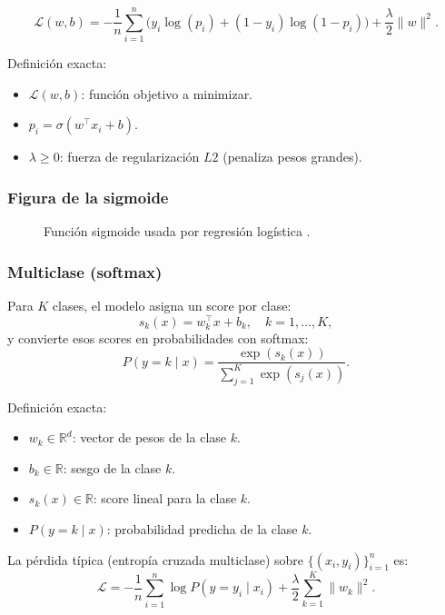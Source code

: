 \documentclass[12pt,oneside]{report}
\newcommand{\R}{\mathbb{R}}
\newcommand{\sigmoid}{\sigma}
\begin{document}
\[
\mathcal{L}(w,b)= -\frac{1}{n}\sum_{i=1}^n \Big(y_i\log(p_i) + (1-y_i)\log(1-p_i)\Big) + \frac{\lambda}{2}\lVert w\rVert^2.
\]

Definición exacta:
\begin{itemize}[leftmargin=*]
  \item $\mathcal{L}(w,b)$: función objetivo a minimizar.
  \item $p_i=\sigmoid(w^\top x_i + b)$.
  \item $\lambda \ge 0$: fuerza de regularización $L2$ (penaliza pesos grandes).
\end{itemize}

\subsubsection{Figura de la sigmoide}
\begin{figure}[H]
\centering
{}
\caption{Función sigmoide usada por regresión logística \cite{islr_logreg}.}
\label{fig:sigmoid}
\end{figure}

\subsubsection{Multiclase (softmax)}
Para $K$ clases, el modelo asigna un score por clase:
\[
s_k(x)=w_k^\top x + b_k, \quad k=1,\dots,K,
\]
y convierte esos scores en probabilidades con softmax:
\[
P(y=k\mid x)=\frac{\exp(s_k(x))}{\sum_{j=1}^K \exp(s_j(x))}.
\]

Definición exacta:
\begin{itemize}[leftmargin=*]
  \item $w_k \in \R^d$: vector de pesos de la clase $k$.
  \item $b_k \in \R$: sesgo de la clase $k$.
  \item $s_k(x)\in\R$: score lineal para la clase $k$.
  \item $P(y=k\mid x)$: probabilidad predicha de la clase $k$.
\end{itemize}

La pérdida típica (entropía cruzada multiclase) sobre $\{(x_i,y_i)\}_{i=1}^n$ es:
\[
\mathcal{L} = -\frac{1}{n}\sum_{i=1}^n \log P(y=y_i\mid x_i) + \frac{\lambda}{2}\sum_{k=1}^K \lVert w_k\rVert^2.
\]
\end{document}
